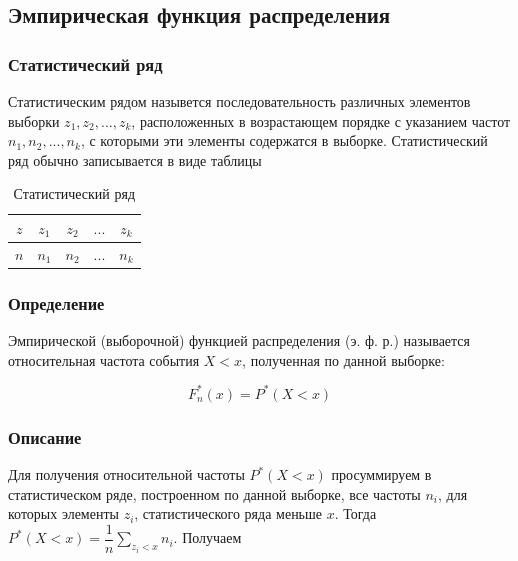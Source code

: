 \documentclass[a4paper]{article}
\begin{document}
    \subsection{Эмпирическая функция распределения}
    
        \subsubsection{Статистический ряд}
        
            Статистическим рядом назывется последовательность различных элементов выборки $z_1, z_2, ..., z_k$, расположенных в возрастающем порядке  с указанием частот $n_1, n_2, ..., n_k$,  с которыми эти элементы содержатся в выборке. Статистический ряд обычно записывается в виде таблицы
            
            \begin{table}[H]
                \centering
                \begin{tabular}{|c|c|c|c|c|}
                    \hline
                     $z$ & $z_1$ & $z_2$ & $...$ & $z_k$ \\ \hline
                     $n$ & $n_1$ & $n_2$ & $...$ & $n_k$ \\ \hline
                \end{tabular}
                \caption{Статистический ряд}
                \label{tab:stat_series}
            \end{table}
            
        \subsubsection{Определение}
            Эмпирической (выборочной) функцией распределения (э. ф. р.) называется
относительная частота события $X < x$, полученная по данной выборке:

            \begin{equation} \label{emperic_function}
                F^*_n(x) = P^*(X < x)
            \end{equation}
            
        \subsubsection{Описание}
            Для получения относительной частоты $P^*(X < x)$  просуммируем в статистическом ряде, построенном по данной выборке, все частоты $n_i$, для которых элементы $z_i$, статистического ряда меньше $x$. Тогда $P^*(X < x) = \dfrac{1}{n}\sum\limits_{z_i < x}n_i$. Получаем
            
\end{document}
